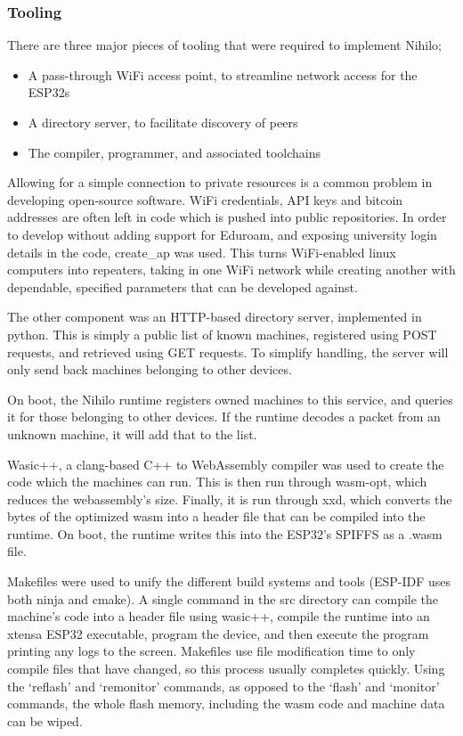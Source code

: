 \documentclass{article}
\begin{document}
\subsubsection{Tooling}

There are three major pieces of tooling that were required to implement Nihilo;
\begin{itemize}
\item A pass-through WiFi access point, to streamline network access for the ESP32s
\item A directory server, to facilitate discovery of peers
\item The compiler, programmer, and associated toolchains
\end{itemize}

Allowing for a simple connection to private resources is a common problem in developing open-source software. WiFi credentials, API keys and bitcoin addresses are often left in code which is pushed into public repositories. In order to develop without adding support for Eduroam, and exposing university login details in the code, create\_ap  was used. This turns WiFi-enabled linux computers into repeaters, taking in one WiFi network while creating another with dependable, specified parameters that can be developed against.

The other component was an HTTP-based directory server, implemented in python. This is simply a public list of known machines, registered using POST requests, and retrieved using GET requests. To simplify handling, the server will only send back machines belonging to other devices. 

On boot, the Nihilo runtime registers owned machines to this service, and queries it for those belonging to other devices. If the runtime decodes a packet from an unknown machine, it will add that to the list.

Wasic++, a clang-based C++ to WebAssembly compiler was used to create the code which the machines can run. This is then run through wasm-opt, which reduces the webassembly's size. Finally, it is run through xxd, which converts the bytes of the optimized wasm into a header file that can be compiled into the runtime. On boot, the runtime writes this into the ESP32's SPIFFS as a .wasm file.

Makefiles were used to unify the different build systems and tools (ESP-IDF uses both ninja and cmake). A single command in the src directory can compile the machine's code into a header file using wasic++, compile the runtime into an xtensa ESP32 executable, program the device, and then execute the program printing any logs to the screen. Makefiles use file modification time to only compile files that have changed, so this process usually completes quickly. Using the `reflash' and `remonitor' commands, as opposed to the `flash' and `monitor' commands, the whole flash memory, including the wasm code and machine data can be wiped.
\end{document}
